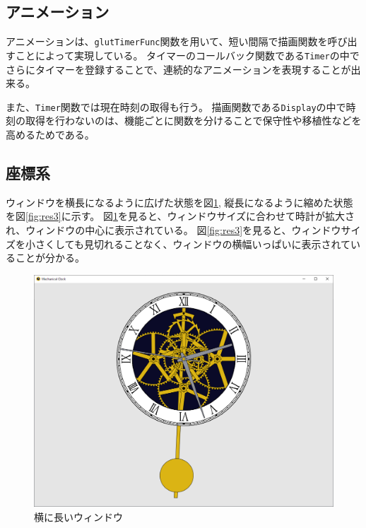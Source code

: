 \documentclass[a4j,titlepage]{jsarticle}
\begin{document}
\subsection{アニメーション}
アニメーションは、\texttt{glutTimerFunc}関数を用いて、短い間隔で描画関数を呼び出すことによって実現している。
タイマーのコールバック関数である\texttt{Timer}の中でさらにタイマーを登録することで、連続的なアニメーションを表現することが出来る。

また、\texttt{Timer}関数では現在時刻の取得も行う。
描画関数である\texttt{Display}の中で時刻の取得を行わないのは、機能ごとに関数を分けることで保守性や移植性などを高めるためである。

\subsection{座標系}
ウィンドウを横長になるように広げた状態を図\ref{fig:res2}, 縦長になるように縮めた状態を図\ref{fig:res3}に示す。
図\ref{fig:res2}を見ると、ウィンドウサイズに合わせて時計が拡大され、ウィンドウの中心に表示されている。
図\ref{fig:res3}を見ると、ウィンドウサイズを小さくしても見切れることなく、ウィンドウの横幅いっぱいに表示されていることが分かる。

\begin{figure}[H]
  \centering
  \includegraphics[width=15cm]{result2.png}
  \caption{横に長いウィンドウ}
  \label{fig:res2}
\end{figure}
\end{document}
